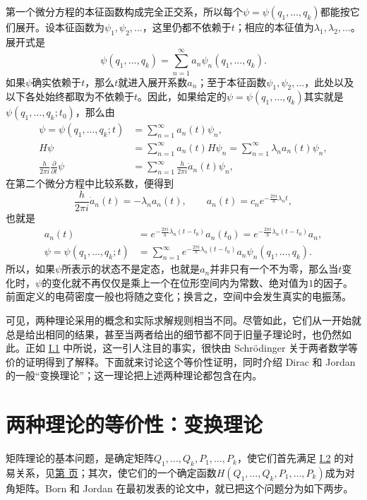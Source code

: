 \documentclass[fontsize=13pt,twoside,openany,headings=normal,parskip=false,bookmarkpackage=false,DIV=calc]{scrbook}
\begin{document}
第一个微分方程的本征函数构成完全正交系，所以每个$\psi=\psi(q_1,\allowbreak \ldots,\allowbreak q_k)$都能按它们展开。设本征函数为$\psi_1,\allowbreak \psi_2,\allowbreak \ldots$，这里仍都不依赖于$t$；相应的本征值为$\lambda_1,\allowbreak \lambda_2,\allowbreak \ldots$。展开式是
\[
 \psi(q_1,\ldots,q_k)=\sum_{n=1}^{\infty}a_n\psi_n(q_1,\ldots,q_k).
\]
如果$\psi$确实依赖于$t$，那么$t$就进入展开系数$a_n$；至于本征函数$\psi_1,\allowbreak \psi_2,\allowbreak \ldots$，此处以及以下各处始终都取为不依赖于$t$。因此，如果给定的$\psi=\psi(q_1,\allowbreak \ldots,\allowbreak q_k)$其实就是$\psi(q_1,\allowbreak \ldots,\allowbreak q_k;t_0)$，那么由
\begin{align*}
 \psi=\psi(q_1,\ldots,q_k;t)&=\sum_{n=1}^{\infty}a_n(t)\psi_n,\\
 H\psi&=\sum_{n=1}^{\infty}a_n(t)H\psi_n
       =\sum_{n=1}^{\infty}\lambda_na_n(t)\psi_n,\\
 \frac{h}{2\pi i}\frac{\partial}{\partial t}\psi
   &=\sum_{n=1}^{\infty}\frac{h}{2\pi i}\dot a_n(t)\psi_n,
\end{align*}
在第二个微分方程中比较系数，便得到
\[
 \frac{h}{2\pi i}\dot a_n(t)=-\lambda_na_n(t),\qquad
 a_n(t)=c_ne^{-\frac{2\pi i}{h}\lambda_nt},
\]
也就是
\begin{align*}
 a_n(t)&=e^{-\frac{2\pi i}{h}\lambda_n(t-t_0)}a_n(t_0)
        =e^{-\frac{2\pi i}{h}\lambda_n(t-t_0)}a_n,\\
 \psi=\psi(q_1,\ldots,q_k;t)
   &=\sum_{n=1}^{\infty}e^{-\frac{2\pi i}{h}\lambda_n(t-t_0)}
     a_n\psi_n(q_1,\ldots,q_k).
\end{align*}
所以，如果$\psi$所表示的状态不是定态，也就是$a_n$并非只有一个不为零，那么当$t$变化时，$\psi$的变化就不再仅仅是乘上一个在位形空间内为常数、绝对值为$1$的因子。前面定义的电荷密度一般也将随之变化；换言之，空间中会发生真实的电振荡。

\hypertarget{origpage-10}{}\label{origpage-10}可见，两种理论采用的概念和实际求解规则相当不同。尽管如此，它们从一开始就总是给出相同的结果，甚至当两者给出的细节都不同于旧量子理论时，也仍然如此。正如 \hyperref[sec:I.1]{I.1} 中所说，这一引人注目的事实，很快由 Schrödinger 关于两者数学等价的证明得到了解释。下面就来讨论这个等价性证明，同时介绍 Dirac 和 Jordan 的一般“变换理论”；这一理论把上述两种理论都包含在内。

\section{两种理论的等价性：变换理论}\label{sec:I.3}
矩阵理论的基本问题，是确定矩阵$Q_1,\allowbreak \ldots,\allowbreak Q_k,\allowbreak P_1,\allowbreak \ldots,\allowbreak P_k$，使它们首先满足 \hyperref[sec:I.2]{I.2} 的对易关系，见\CJKglue \hyperref[rel:I.2.commutation]{第 \pageref*{rel:I.2.commutation} 页}；其次，使它们的一个确定函数$H(Q_1,\allowbreak \ldots,\allowbreak Q_k,\allowbreak P_1,\allowbreak \ldots,\allowbreak P_k)$成为对角矩阵。Born 和 Jordan 在最初发表的论文中，就已把这个问题分为如下两步。
\end{document}
